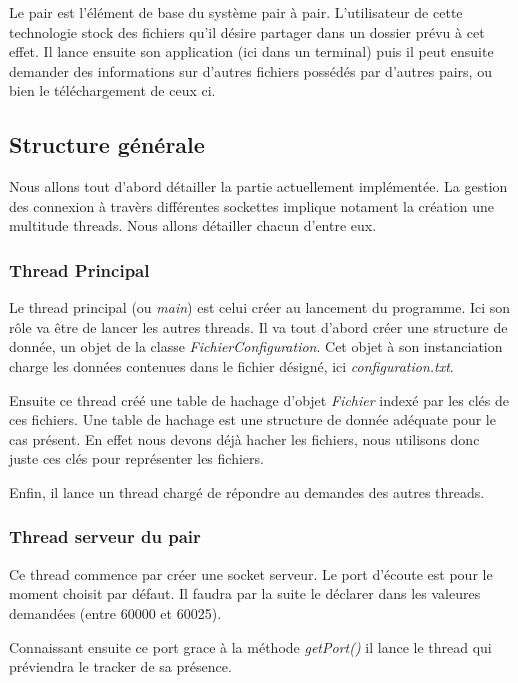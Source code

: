 Le pair est l'élément de base du système pair à pair. L'utilisateur de cette technologie stock des fichiers qu'il désire partager dans un dossier prévu à cet effet. Il lance ensuite son application (ici dans un terminal) puis il peut ensuite demander des informations sur d'autres fichiers possédés par d'autres pairs, ou bien le téléchargement de ceux ci.


\subsection{Structure générale}
Nous allons tout d'abord détailler la partie actuellement implémentée.
La gestion des connexion à travèrs différentes sockettes implique notament la création une multitude threads. Nous allons détailler chacun d'entre eux.



\subsubsection*{Thread Principal}
Le thread principal (ou \textit{main}) est celui créer au lancement du programme. Ici son rôle va être de lancer les autres threads. 
Il va tout d'abord créer une structure de donnée, un objet de la classe \textit{FichierConfiguration}. Cet objet à son instanciation charge les données contenues dans le fichier désigné, ici \textit{configuration.txt}. 

Ensuite ce thread créé une table de hachage d'objet \textit{Fichier} indexé par les clés de ces fichiers. Une table de hachage est une structure de donnée adéquate pour le cas présent. En effet nous devons déjà hacher les fichiers, nous utilisons donc juste ces clés pour représenter les fichiers. 

Enfin, il lance un thread chargé de répondre au demandes des autres threads.

\subsubsection*{Thread serveur du pair}
Ce thread commence par créer une socket serveur. Le port d'écoute est pour le moment choisit par défaut. Il faudra par la suite le déclarer dans les valeures demandées (entre 60000 et 60025). 

Connaissant ensuite ce port grace à la méthode \textit{getPort()} il lance le thread qui préviendra le tracker de sa présence.

